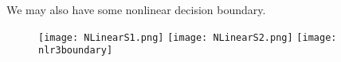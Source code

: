We may also have some nonlinear decision boundary.
\begin{figure}[H]
	\begin{center}
		\texttt{[image: NLinearS1.png]}  \quad \quad  \texttt{[image: NLinearS2.png]} \quad \quad 
		 \texttt{[image: nlr3boundary]}
	\end{center}
\end{figure}
